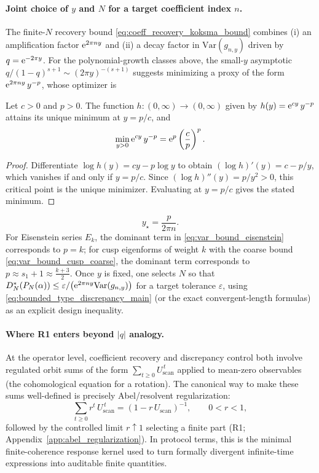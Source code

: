 \paragraph{Joint choice of \texorpdfstring{$y$}{y} and \texorpdfstring{$N$}{N} for a target coefficient index \texorpdfstring{$n$}{n}.}
The finite-$N$ recovery bound \eqref{eq:coeff_recovery_koksma_bound} combines (i) an amplification factor $\mathrm{e}^{2\pi n y}$ and (ii) a decay factor in $\mathrm{Var}(g_{n,y})$ driven by $q=\mathrm{e}^{-2\pi y}$. For the polynomial-growth classes above, the small-$y$ asymptotic $q/(1-q)^{s+1}\sim (2\pi y)^{-(s+1)}$ suggests minimizing a proxy of the form $\mathrm{e}^{2\pi n y}\,y^{-p}$, whose optimizer is
\begin{lemma}
\label{lem:exp_power_tradeoff}
Let $c>0$ and $p>0$. The function $h:(0,\infty)\to(0,\infty)$ given by $h(y)=\mathrm{e}^{c y}\,y^{-p}$ attains its unique minimum at $y=p/c$, and
\begin{equation}
\min_{y>0}\mathrm{e}^{c y}\,y^{-p}=\mathrm{e}^{p}\left(\frac{c}{p}\right)^{p}.
\end{equation}
\end{lemma}
\begin{proof}
Differentiate $\log h(y)=c y-p\log y$ to obtain $(\log h)'(y)=c-p/y$, which vanishes if and only if $y=p/c$. Since $(\log h)''(y)=p/y^2>0$, this critical point is the unique minimizer. Evaluating at $y=p/c$ gives the stated minimum.
\end{proof}
\begin{equation}
y_\star = \frac{p}{2\pi n}.
\label{eq:y_star_rule}
\end{equation}
For Eisenstein series $E_k$, the dominant term in \eqref{eq:var_bound_eisenstein} corresponds to $p=k$; for cusp eigenforms of weight $k$ with the coarse bound \eqref{eq:var_bound_cusp_coarse}, the dominant term corresponds to $p\approx s_1+1\approx \frac{k+3}{2}$.
Once $y$ is fixed, one selects $N$ so that $D_N^\ast(P_N(\alpha))\le \varepsilon/\bigl(\mathrm{e}^{2\pi n y}\mathrm{Var}(g_{n,y})\bigr)$ for a target tolerance $\varepsilon$, using \eqref{eq:bounded_type_discrepancy_main} (or the exact convergent-length formulas) as an explicit design inequality.

\paragraph{Where R1 enters beyond \texorpdfstring{$|q|$}{|q|} analogy.}
At the operator level, coefficient recovery and discrepancy control both involve regulated orbit sums of the form $\sum_{t\ge 0} U_{\mathrm{scan}}^{\,t}$ applied to mean-zero observables (the cohomological equation for a rotation). The canonical way to make these sums well-defined is precisely Abel/resolvent regularization:
\begin{equation}
\sum_{t\ge 0} r^t\,U_{\mathrm{scan}}^{\,t}=(1-r\,U_{\mathrm{scan}})^{-1},\qquad 0<r<1,
\end{equation}
followed by the controlled limit $r\uparrow 1$ selecting a finite part (R1; Appendix~\ref{app:abel_regularization}). In protocol terms, this is the minimal finite-coherence response kernel used to turn formally divergent infinite-time expressions into auditable finite quantities.

